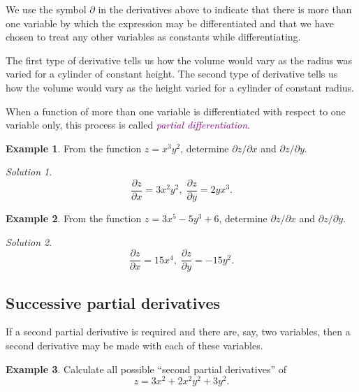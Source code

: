 \documentclass[
  english,
  11pt,
  oneside]{book}
\newcommand{\slide}{}
\theoremstyle{definition}
\theoremstyle{definition}
\newtheorem{example}{Example}[chapter]
\theoremstyle{definition}
\theoremstyle{definition}
\theoremstyle{remark}
\newtheorem*{solution}{Solution}
\begin{document}
We use the symbol \(\partial\) in the derivatives above to indicate that there is more than one variable by which the expression may be differentiated and that we have chosen to treat any other variables as constants while differentiating.

The first type of derivative tells us how the volume would vary as the radius was varied for a cylinder of constant height. The second type of derivative tells us how the volume would vary as the height varied for a cylinder of constant radius.

When a function of more than one variable is differentiated with respect to one variable only, this process is called \textcolor{purple}{\em partial differentiation}.

\slide

\begin{example}
From the function \(z=x^3y^2\), determine \(\partial z/\partial x\) and \(\partial z/\partial y\).
\end{example}

\begin{solution}
\[\frac{\partial z}{\partial x} = 3x^2y^2,\;\frac{\partial z}{\partial y} = 2yx^3.\]
\end{solution}

\slide

\begin{example}
From the function \(z=3x^5-5y^3+6\), determine \(\partial z/\partial x\) and \(\partial z/\partial y\).
\end{example}

\begin{solution}
\[\frac{\partial z}{\partial x} = 15x^4,\;\frac{\partial z}{\partial y} = -15y^2.\]
\end{solution}

\slide

\subsection{Successive partial derivatives}\label{successive-partial-derivatives}

If a second partial derivative is required and there are, say, two variables, then a second derivative may be made with each of these variables.

\begin{example}
Calculate all possible ``second partial derivatives'' of
\[z=3x^2+2x^2y^2+3y^2.\]
\end{example}
\end{document}
